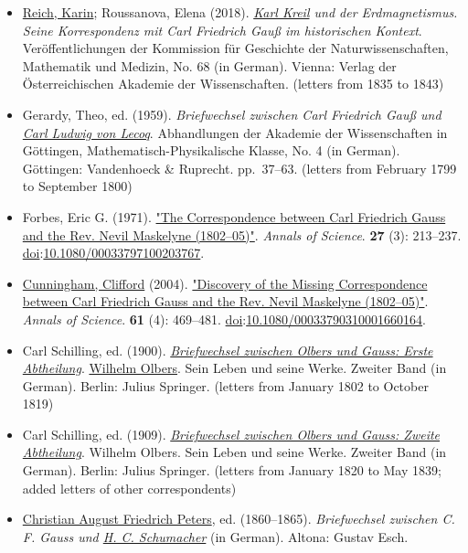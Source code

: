 \begin{itemize}
\item
  {\href{https://en.wikipedia.org/wiki/Karin_Reich}{Reich, Karin}; Roussanova, Elena (2018). \emph{\href{https://en.wikipedia.org/wiki/Karl_Kreil}{Karl Kreil} und der Erdmagnetismus. Seine Korrespondenz mit Carl Friedrich Gauß im historischen Kontext}. Veröffentlichungen der Kommission für Geschichte der Naturwissenschaften, Mathematik und Medizin, No. 68 (in German). Vienna: Verlag der Österreichischen Akademie der Wissenschaften.{} (letters from 1835 to 1843)}
\item
  {Gerardy, Theo, ed. (1959). \emph{Briefwechsel zwischen Carl Friedrich Gauß und \href{https://en.wikipedia.org/wiki/Karl_Ludwig_von_Lecoq}{Carl Ludwig von Lecoq}}. Abhandlungen der Akademie der Wissenschaften in Göttingen, Mathematisch-Physikalische Klasse, No. 4 (in German). Göttingen: Vandenhoeck \& Ruprecht. pp.{~}{37--}63.{} (letters from February 1799 to September 1800)}
\item
  {Forbes, Eric G. (1971). \href{https://www.tandfonline.com/doi/abs/10.1080/00033797100203767}{"The Correspondence between Carl Friedrich Gauss and the Rev. Nevil Maskelyne (1802--05)"}. \emph{Annals of Science}. \textbf{27} (3): {213--}237. \href{https://en.wikipedia.org/wiki/Doi_(identifier)}{doi}:\href{https://doi.org/10.1080\%2F00033797100203767}{10.1080/00033797100203767}.{}}
\item
  {\href{https://en.wikipedia.org/wiki/Clifford_Cunningham}{Cunningham, Clifford} (2004). \href{https://www.tandfonline.com/doi/abs/10.1080/00033790310001660164}{"Discovery of the Missing Correspondence between Carl Friedrich Gauss and the Rev. Nevil Maskelyne (1802--05)"}. \emph{Annals of Science}. \textbf{61} (4): {469--}481. \href{https://en.wikipedia.org/wiki/Doi_(identifier)}{doi}:\href{https://doi.org/10.1080\%2F00033790310001660164}{10.1080/00033790310001660164}.{}}
\item
  {Carl Schilling, ed. (1900). \href{https://archive.org/details/p1wilhelmolberss02olbeuoft/page/n5/mode/2up}{\emph{Briefwechsel zwischen Olbers und Gauss: Erste Abtheilung}}. \href{https://en.wikipedia.org/wiki/Wilhelm_Olbers}{Wilhelm Olbers}. Sein Leben und seine Werke. Zweiter Band (in German). Berlin: Julius Springer.{} (letters from January 1802 to October 1819)}
\item
  {Carl Schilling, ed. (1909). \href{https://archive.org/details/p2wilhelmolberss02olbeuoft/page/n7/mode/2up}{\emph{Briefwechsel zwischen Olbers und Gauss: Zweite Abtheilung}}. Wilhelm Olbers. Sein Leben und seine Werke. Zweiter Band (in German). Berlin: Julius Springer.{} (letters from January 1820 to May 1839; added letters of other correspondents)}
\item
  {\href{https://en.wikipedia.org/wiki/Christian_August_Friedrich_Peters}{Christian August Friedrich Peters}, ed. (1860--1865). \emph{Briefwechsel zwischen C. F. Gauss und \href{https://en.wikipedia.org/wiki/H._C._Schumacher}{H. C. Schumacher}} (in German). Altona: Gustav Esch.{}}


\end{itemize}
